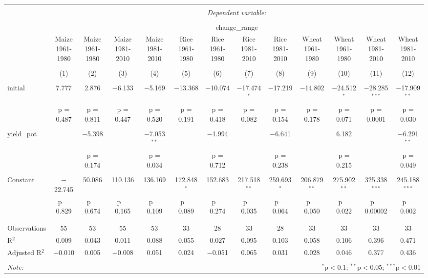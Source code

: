 
\begin{table}[!htbp] \centering 
  \caption{} 
  \label{} 
\begin{tabular}{@{\extracolsep{5pt}}lcccccccccccc} 
\\[-1.8ex]\hline 
\hline \\[-1.8ex] 
 & \multicolumn{12}{c}{\textit{Dependent variable:}} \\ 
\cline{2-13} 
\\[-1.8ex] & \multicolumn{12}{c}{change\_range} \\ 
 & Maize 1961-1980 & Maize 1961-1980 & Maize 1981-2010 & Maize 1981-2010 & Rice 1961-1980 & Rice 1961-1980 & Rice 1981-2010 & Rice 1981-2010 & Wheat 1961-1980 & Wheat 1961-1980 & Wheat 1981-2010 & Wheat 1981-2010 \\ 
\\[-1.8ex] & (1) & (2) & (3) & (4) & (5) & (6) & (7) & (8) & (9) & (10) & (11) & (12)\\ 
\hline \\[-1.8ex] 
 initial & 7.777 & 2.876 & $-$6.133 & $-$5.169 & $-$13.368 & $-$10.074 & $-$17.474$^{*}$ & $-$17.219 & $-$14.802 & $-$24.512$^{*}$ & $-$28.285$^{***}$ & $-$17.909$^{**}$ \\ 
  & p = 0.487 & p = 0.811 & p = 0.447 & p = 0.520 & p = 0.191 & p = 0.418 & p = 0.082 & p = 0.154 & p = 0.178 & p = 0.071 & p = 0.0001 & p = 0.030 \\ 
  & & & & & & & & & & & & \\ 
 yield\_pot &  & $-$5.398 &  & $-$7.053$^{**}$ &  & $-$1.994 &  & $-$6.641 &  & 6.182 &  & $-$6.291$^{**}$ \\ 
  &  & p = 0.174 &  & p = 0.034 &  & p = 0.712 &  & p = 0.238 &  & p = 0.215 &  & p = 0.049 \\ 
  & & & & & & & & & & & & \\ 
 Constant & $-$22.745 & 50.086 & 110.136 & 136.169 & 172.848$^{*}$ & 152.683 & 217.518$^{**}$ & 259.693$^{*}$ & 206.879$^{**}$ & 275.902$^{**}$ & 325.338$^{***}$ & 245.188$^{***}$ \\ 
  & p = 0.829 & p = 0.674 & p = 0.165 & p = 0.109 & p = 0.089 & p = 0.274 & p = 0.035 & p = 0.064 & p = 0.050 & p = 0.022 & p = 0.00002 & p = 0.002 \\ 
  & & & & & & & & & & & & \\ 
\hline \\[-1.8ex] 
Observations & 55 & 53 & 55 & 53 & 33 & 28 & 33 & 28 & 33 & 33 & 33 & 33 \\ 
R$^{2}$ & 0.009 & 0.043 & 0.011 & 0.088 & 0.055 & 0.027 & 0.095 & 0.103 & 0.058 & 0.106 & 0.396 & 0.471 \\ 
Adjusted R$^{2}$ & $-$0.010 & 0.005 & $-$0.008 & 0.051 & 0.024 & $-$0.051 & 0.065 & 0.031 & 0.028 & 0.046 & 0.377 & 0.436 \\ 
\hline 
\hline \\[-1.8ex] 
\textit{Note:}  & \multicolumn{12}{r}{$^{*}$p$<$0.1; $^{**}$p$<$0.05; $^{***}$p$<$0.01} \\ 
\end{tabular} 
\end{table} 
